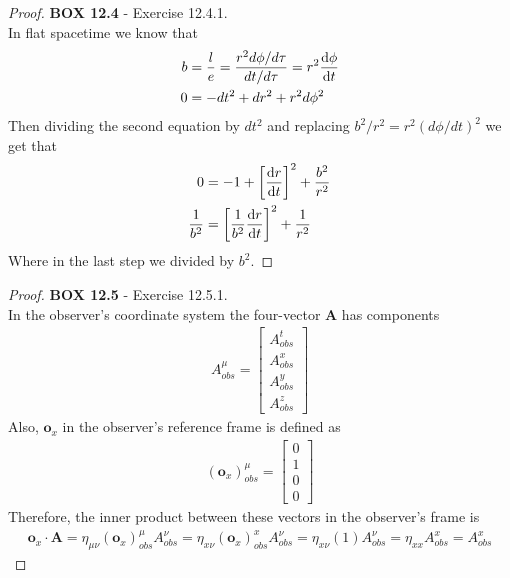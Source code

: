 \documentclass[11pt]{article}
\theoremstyle{definition}
\begin{document}
\cleardoublepage
\begin{proof}{\textbf{BOX 12.4} - Exercise 12.4.1.}\\
    In flat spacetime we know that
    \begin{align*}
        b &= \frac{l}{e} = \frac{r^2 d\phi/d\tau}{dt/d\tau} = r^2 \dv{\phi}{t}\\
        0 &= -dt^2 + dr^2 +r^2d\phi^2
    \end{align*}
    Then dividing the second equation by $dt^2$ and replacing
    $b^2/r^2 = r^2 (d\phi/dt)^2$ we get that
    \begin{align*}
        0 &= -1 + \left[\dv{r}{t}\right]^2 + \frac{b^2}{r^2}\\
        \frac{1}{b^2} &= \left[\frac{1}{b^2}\dv{r}{t}\right]^2 + \frac{1}{r^2}
    \end{align*}
    Where in the last step we divided by $b^2$.
\end{proof}
\cleardoublepage
\begin{proof}{\textbf{BOX 12.5} - Exercise 12.5.1.}\\
    In the observer's coordinate system the four-vector $\bm{A}$ has components
    \begin{align*}
        A_{obs}^\mu = \begin{bmatrix}
            A_{obs}^t \\ A_{obs}^x \\ A_{obs}^y \\ A_{obs}^z
        \end{bmatrix}
    \end{align*}
    Also, $\bm{o}_x$ in the observer's reference frame is defined as
    \begin{align*}
        (\bm{o}_x)_{obs}^\mu = \begin{bmatrix}
            0 \\ 1 \\ 0 \\ 0
        \end{bmatrix}
    \end{align*}
    Therefore, the inner product between these vectors in the observer's frame
    is
    \begin{align*}
        \bm{o}_x \cdot \bm{A} = \eta_{\mu\nu}(\bm{o}_x)_{obs}^\mu A_{obs}^\nu
        = \eta_{x\nu}(\bm{o}_x)_{obs}^x A_{obs}^\nu
        = \eta_{x\nu}(1) A_{obs}^\nu
        = \eta_{xx} A_{obs}^x
        = A_{obs}^x
    \end{align*}
\end{proof}
\end{document}
